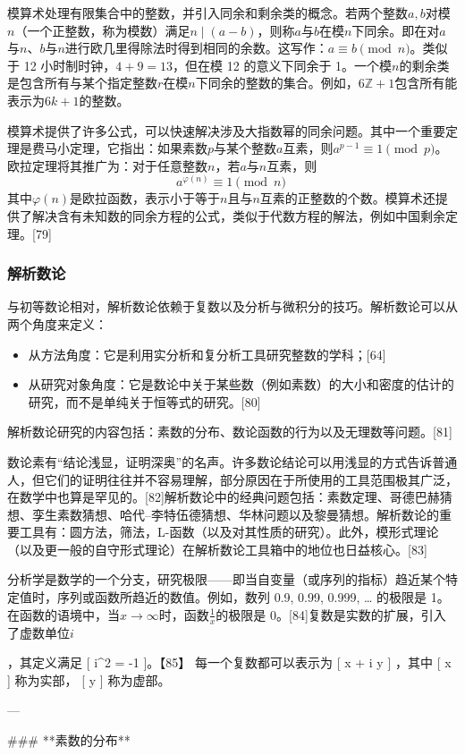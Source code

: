 模算术处理有限集合中的整数，并引入同余和剩余类的概念。若两个整数$a, b$对模$n$（一个正整数，称为模数）满足$n \mid (a-b)$，则称$a$与$b$在模$n$下同余。即在对$a$与$n$、$b$与$n$进行欧几里得除法时得到相同的余数。这写作：$a \equiv b \pmod{n}$。类似于 12 小时制时钟，$4 + 9 = 13$，但在模 12 的意义下同余于 1。一个模$n$的剩余类是包含所有与某个指定整数$r$在模$n$下同余的整数的集合。例如，$6\mathbb{Z} + 1$包含所有能表示为$6k+1$的整数。

模算术提供了许多公式，可以快速解决涉及大指数幂的同余问题。其中一个重要定理是费马小定理，它指出：如果素数$p$与某个整数$a$互素，则$a^{p-1} \equiv 1 \pmod{p}$。欧拉定理将其推广为：对于任意整数$n$，若$a$与$n$互素，则
$$
a^{\varphi(n)} \equiv 1 \pmod{n}~
$$
其中$\varphi(n)$是欧拉函数，表示小于等于$n$且与$n$互素的正整数的个数。模算术还提供了解决含有未知数的同余方程的公式，类似于代数方程的解法，例如中国剩余定理。[79]
\subsubsection{解析数论}
与初等数论相对，解析数论依赖于复数以及分析与微积分的技巧。解析数论可以从两个角度来定义：
\begin{itemize}
\item 从方法角度：它是利用实分析和复分析工具研究整数的学科；[64]
\item 从研究对象角度：它是数论中关于某些数（例如素数）的大小和密度的估计的研究，而不是单纯关于恒等式的研究。[80]
\end{itemize}
解析数论研究的内容包括：素数的分布、数论函数的行为以及无理数等问题。[81]

数论素有“结论浅显，证明深奥”的名声。许多数论结论可以用浅显的方式告诉普通人，但它们的证明往往并不容易理解，部分原因在于所使用的工具范围极其广泛，在数学中也算是罕见的。[82]解析数论中的经典问题包括：素数定理、哥德巴赫猜想、孪生素数猜想、哈代–李特伍德猜想、华林问题以及黎曼猜想。解析数论的重要工具有：圆方法，筛法，L-函数（以及对其性质的研究）。此外，模形式理论（以及更一般的自守形式理论）在解析数论工具箱中的地位也日益核心。[83]

分析学是数学的一个分支，研究极限——即当自变量（或序列的指标）趋近某个特定值时，序列或函数所趋近的数值。例如，数列 0.9, 0.99, 0.999, … 的极限是 1。在函数的语境中，当$x \to \infty$时，函数$\frac{1}{x}$的极限是 0。[84]复数是实数的扩展，引入了虚数单位$i$

，其定义满足
[
i^2 = -1
]。【85】 每一个复数都可以表示为
[
x + i y
]
，其中
[
x
] 称为实部，
[
y
] 称为虚部。

---

### **素数的分布**

